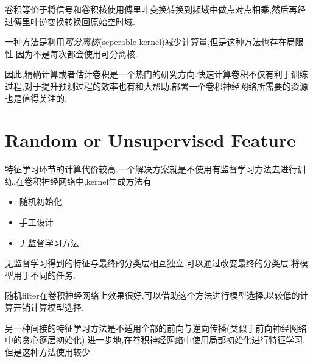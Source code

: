 卷积等价于将信号和卷积核使用傅里叶变换转换到频域中做点对点相乘,然后再经过傅里叶逆变换转换回原始空时域.

一种方法是利用\textit{可分离核}(seperable kernel)减少计算量,但是这种方法也存在局限性.因为不是每次都会使用可分离核.

因此,精确计算或者估计卷积是一个热门的研究方向.快速计算卷积不仅有利于训练过程,对于提升预测过程的效率也有和大帮助.部署一个卷积神经网络所需要的资源也是值得关注的.

\section{Random or Unsupervised Feature}

特征学习环节的计算代价较高.一个解决方案就是不使用有监督学习方法去进行训练.在卷积神经网络中,kernel生成方法有
\begin{itemize}
    \item 随机初始化
    \item 手工设计
    \item 无监督学习方法
\end{itemize}
无监督学习得到的特征与最终的分类层相互独立.可以通过改变最终的分类层,将模型用于不同的任务.

随机filter在卷积神经网络上效果很好,可以借助这个方法进行模型选择,以较低的计算开销计算模型选择.

另一种间接的特征学习方法是不适用全部的前向与逆向传播(类似于前向神经网络中的贪心逐层初始化).进一步地,在卷积神经网络中使用局部初始化进行特征学习.但是这种方法使用较少.